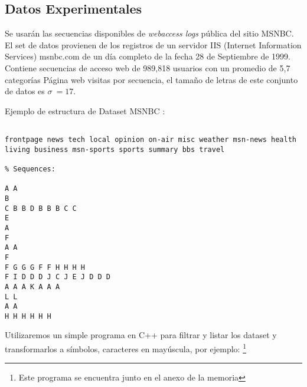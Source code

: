 






\subsection{Datos Experimentales}

Se usarán las secuencias disponibles de \emph{webaccess logs} pública del sitio MSNBC. El set de datos provienen de los registros de un servidor IIS (Internet Information Services) msnbc.com de un día completo de la fecha  28 de Septiembre de 1999. 
Contiene secuencias de acceso web de 989,818 usuarios con un promedio de 5,7  categorías Página web visitas por secuencia, el tamaño de letras de este conjunto de datos es $\sigma \ = 17$.


Ejemplo de estructura de Dataset MSNBC :
\vspace{1cm}

\begin{lstlisting}[frame=single,basicstyle=\ttfamily\tiny,]
% Different categories found in input file:

frontpage news tech local opinion on-air misc weather msn-news health living business msn-sports sports summary bbs travel

% Sequences:

A A 
B 
C B B D B B B C C 
E 
A 
F 
A A 
F 
F G G G F F H H H H 
F I D D D J C J E J D D D 
A A A K A A A 
L L 
A A 
H H H H H H 
\end{lstlisting}





Utilizaremos un simple programa en C++ para filtrar y listar los dataset y transformarlos a símbolos, caracteres en mayúscula, por ejemplo: 
\footnote{Este programa se encuentra junto en el anexo de la memoria}

